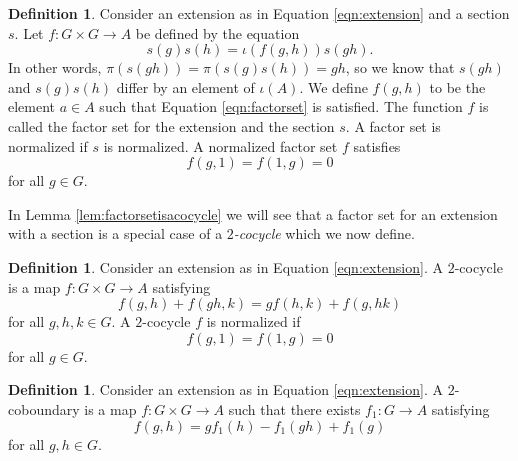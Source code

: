 \documentclass{dcthesis}
\newcommand{\defi}[1]{\textsf{#1}}
\theoremstyle{definition}
\newtheorem{definition}[prop]{Definition}
\theoremstyle{remark}
\numberwithin{equation}{section}
\numberwithin{figure}{section}
\begin{document}
{{    %
    \begin{definition}
      \label{def:factorset}
      Consider an extension as in Equation \ref{eqn:extension}
      and a section $s$.
      Let $f\colon G\times G\to A$ be defined by the equation
      \begin{equation}
        \label{eqn:factorset}
        s(g)s(h) = \iota(f(g,h))s(gh).
      \end{equation}
      In other words,
      $\pi(s(gh)) = \pi(s(g)s(h)) = gh$,
      so we know that
      $s(gh)$ and $s(g)s(h)$ differ by an element of $\iota(A)$.
      We define $f(g,h)$ to be the element $a\in A$
      such that
      Equation \ref{eqn:factorset}
      is satisfied.
      The function $f$ is called the \defi{factor set}
      for the extension and the section $s$.
      A factor set is \defi{normalized}
      if $s$ is normalized.
      A normalized factor set $f$ satisfies
      \[
        f(g,1)=f(1,g)=0
      \]
      for all $g\in G$.
    \end{definition}
    In Lemma \ref{lem:factorsetisacocycle}
    we will see that a factor set for an extension with a section
    is a special case of a
    \emph{$2$-cocycle}
    which we now define.
    \begin{definition}
      \label{def:twococycle}
      Consider an extension as in Equation \ref{eqn:extension}.
      A \defi{$2$-cocycle}
      is a map
      $f\colon G\times G\to A$
      satisfying
      \begin{equation}
        \label{eqn:twococycle}
        f(g,h)+f(gh,k)=gf(h,k)+f(g,hk)
      \end{equation}
      for all $g,h,k\in G$.
      A $2$-cocycle $f$ is \defi{normalized}
      if
      \[
        f(g,1)=f(1,g)=0
      \]
      for all $g\in G$.
    \end{definition}
    \begin{definition}
      \label{def:twocoboundary}
      Consider an extension as in Equation \ref{eqn:extension}.
      A \defi{$2$-coboundary}
      is a map
      $f\colon G\times G\to A$
      such that there exists
      $f_1\colon G\to A$ satisfying
      \begin{equation}
        \label{eqn:twocoboundary}
        f(g,h) = gf_1(h)-f_1(gh)+f_1(g)
      \end{equation}
      for all $g,h\in G$.

\end{definition}}}
\end{document}
